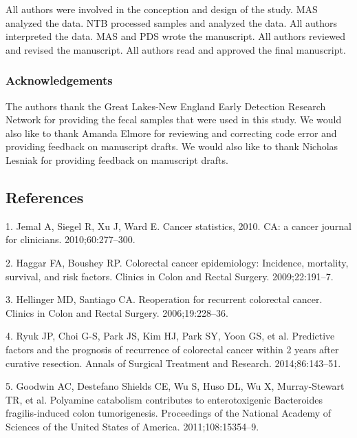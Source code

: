 \documentclass[12pt,]{article}
\begin{document}
All authors were involved in the conception and design of the study. MAS
analyzed the data. NTB processed samples and analyzed the data. All
authors interpreted the data. MAS and PDS wrote the manuscript. All
authors reviewed and revised the manuscript. All authors read and
approved the final manuscript.

\subsubsection{Acknowledgements}\label{acknowledgements}

The authors thank the Great Lakes-New England Early Detection Research
Network for providing the fecal samples that were used in this study. We
would also like to thank Amanda Elmore for reviewing and correcting code
error and providing feedback on manuscript drafts. We would also like to
thank Nicholas Lesniak for providing feedback on manuscript drafts.

\newpage

\subsection*{References}\label{references}

\hypertarget{refs}{}
\hypertarget{ref-jemal_cancer_2010}{}
1. Jemal A, Siegel R, Xu J, Ward E. Cancer statistics, 2010. CA: a
cancer journal for clinicians. 2010;60:277--300.

\hypertarget{ref-haggar_colorectal_2009}{}
2. Haggar FA, Boushey RP. Colorectal cancer epidemiology: Incidence,
mortality, survival, and risk factors. Clinics in Colon and Rectal
Surgery. 2009;22:191--7.

\hypertarget{ref-hellinger_reoperation_2006}{}
3. Hellinger MD, Santiago CA. Reoperation for recurrent colorectal
cancer. Clinics in Colon and Rectal Surgery. 2006;19:228--36.

\hypertarget{ref-ryuk_predictive_2014}{}
4. Ryuk JP, Choi G-S, Park JS, Kim HJ, Park SY, Yoon GS, et al.
Predictive factors and the prognosis of recurrence of colorectal cancer
within 2 years after curative resection. Annals of Surgical Treatment
and Research. 2014;86:143--51.

\hypertarget{ref-goodwin_polyamine_2011}{}
5. Goodwin AC, Destefano Shields CE, Wu S, Huso DL, Wu X, Murray-Stewart
TR, et al. Polyamine catabolism contributes to enterotoxigenic
Bacteroides fragilis-induced colon tumorigenesis. Proceedings of the
National Academy of Sciences of the United States of America.
2011;108:15354--9.
\end{document}
